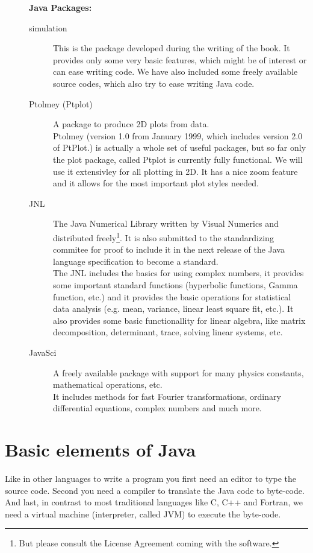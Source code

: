 \begin{description}
\item[] \textbf{Java Packages:}
\begin{description}
\item[simulation] This is the package developed during the writing
        of the book. It provides only some very basic features, which
        might be of interest or can ease writing code. We have also
        included some freely available source codes, which also
        try to ease writing Java code.
\item[Ptolmey (Ptplot)] A package to produce 2D plots from data. \\
        Ptolmey (version 1.0 from January 1999, which includes version
        2.0 of PtPlot.)
        is actually a whole set of useful packages, but so far only the
        plot package, called Ptplot is currently fully functional. We will
        use it extensivley for all plotting in 2D. It has a nice
        zoom feature and it allows for the most important plot styles
        needed.
\item[JNL] The Java Numerical Library written by Visual Numerics and
        distributed freely\footnote{But please consult the License Agreement
        coming with the software.}. It is also submitted to the standardizing
        commitee for proof to include it in the next release of the
        Java language specification to become a standard. \\
        The JNL includes the basics for using complex numbers, it
        provides some important standard functions (hyperbolic
        functions, Gamma function, etc.) and it provides 
        the basic operations for statistical data analysis (e.g. mean,
        variance, linear least square fit, etc.). It also provides some
        basic functionallity for linear algebra, like matrix decomposition,
        determinant, trace, solving linear systems, etc.
\item[JavaSci] A freely available package with support for many 
  physics constants, mathematical operations, etc. \\
   It includes methods for fast Fourier transformations, ordinary differential 
   equations, complex numbers and much more.
\end{description}

\end{description}



\section{Basic elements of Java}
\label{sec:Basic_elements_of_Java}
Like in other languages to write a program you first need an editor
to type the source code. Second you need a compiler to translate
the Java code to byte-code. And last, in contrast to most
traditional languages like C, C++ and Fortran, we need a virtual
machine (interpreter, called JVM) to execute the byte-code.

